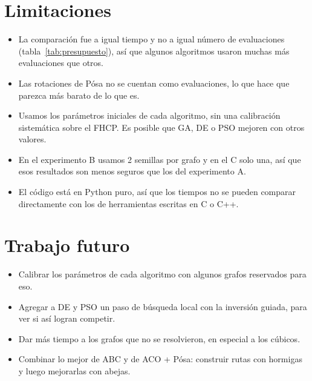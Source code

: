 \section{Limitaciones}
\begin{itemize}
  \item La comparación fue a igual tiempo y no a igual número de evaluaciones
        (tabla~\ref{tab:presupuesto}), así que algunos algoritmos usaron muchas más evaluaciones
        que otros.
  \item Las rotaciones de Pósa no se cuentan como evaluaciones, lo que hace que 
        parezca más barato de lo que es.
  \item Usamos los parámetros iniciales de cada algoritmo, sin una calibración sistemática sobre el
        FHCP. Es posible que GA, DE o PSO mejoren con otros valores.
  \item En el experimento B usamos 2 semillas por grafo y en el C solo una, así que esos resultados
        son menos seguros que los del experimento A.
  \item El código está en Python puro, así que los tiempos no se pueden comparar directamente con
        los de herramientas escritas en C o C++.
\end{itemize}

\section{Trabajo futuro}
\begin{itemize}
  \item Calibrar los parámetros de cada algoritmo con algunos grafos reservados para eso.
  \item Agregar a DE y PSO un paso de búsqueda local con la inversión guiada, para ver si así
        logran competir.
  \item Dar más tiempo a los grafos que no se resolvieron, en especial a los cúbicos.
  \item Combinar lo mejor de ABC y de ACO + Pósa: construir rutas con hormigas y luego mejorarlas
        con abejas.
\end{itemize}

